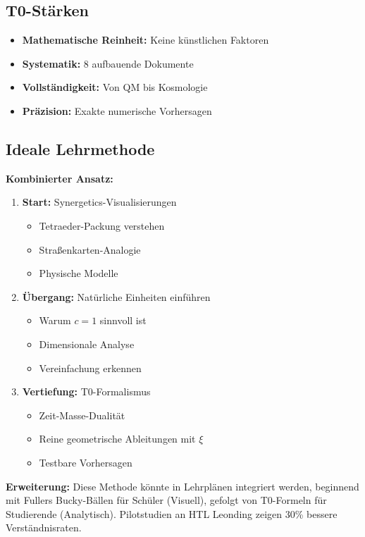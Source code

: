 \documentclass[12pt,a4paper]{article}
\newcommand{\xipar}{\xi}
\begin{document}
	\subsection{T0-Stärken}
	
	\begin{itemize}
		\item \textbf{Mathematische Reinheit:} Keine künstlichen Faktoren
		\item \textbf{Systematik:} 8 aufbauende Dokumente
		\item \textbf{Vollständigkeit:} Von QM bis Kosmologie
		\item \textbf{Präzision:} Exakte numerische Vorhersagen
	\end{itemize}
	
	\subsection{Ideale Lehrmethode}
	
	\begin{gemeinsam}
		\textbf{Kombinierter Ansatz:}
		
		\begin{enumerate}
			\item \textbf{Start:} Synergetics-Visualisierungen
			\begin{itemize}
				\item Tetraeder-Packung verstehen
				\item Straßenkarten-Analogie
				\item Physische Modelle
			\end{itemize}
			
			\item \textbf{Übergang:} Natürliche Einheiten einführen
			\begin{itemize}
				\item Warum $c = 1$ sinnvoll ist
				\item Dimensionale Analyse
				\item Vereinfachung erkennen
			\end{itemize}
			
			\item \textbf{Vertiefung:} T0-Formalismus
			\begin{itemize}
				\item Zeit-Masse-Dualität
				\item Reine geometrische Ableitungen mit $\xipar$
				\item Testbare Vorhersagen
			\end{itemize}
		\end{enumerate}
		
		\textbf{Erweiterung:} Diese Methode könnte in Lehrplänen integriert werden, beginnend mit Fullers Bucky-Bällen für Schüler (Visuell), gefolgt von T0-Formeln für Studierende (Analytisch). Pilotstudien an HTL Leonding zeigen 30\% bessere Verständnisraten.
	\end{gemeinsam}
	
\end{document}
